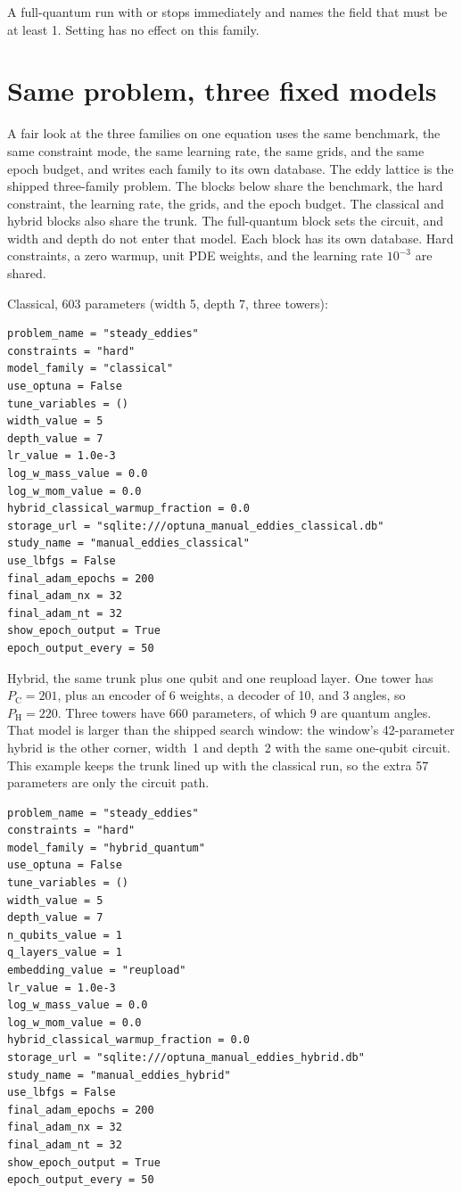 A full-quantum run with  or  stops immediately and names the field that must be at least 1.
Setting  has no effect on this family.

\section{Same problem, three fixed models}
\label{ex:three-fixed}

A fair look at the three families on one equation uses the same benchmark, the same constraint mode, the same learning rate, the same grids, and the same epoch budget, and writes each family to its own database.
The eddy lattice is the shipped three-family problem.
The blocks below share the benchmark, the hard constraint, the learning rate, the grids, and the epoch budget.
The classical and hybrid blocks also share the trunk.
The full-quantum block sets the circuit, and width and depth do not enter that model.
Each block has its own database.
Hard constraints, a zero warmup, unit PDE weights, and the learning rate \(10^{-3}\) are shared.

Classical, 603 parameters (width 5, depth 7, three towers):

\begin{lstlisting}
problem_name = "steady_eddies"
constraints = "hard"
model_family = "classical"
use_optuna = False
tune_variables = ()
width_value = 5
depth_value = 7
lr_value = 1.0e-3
log_w_mass_value = 0.0
log_w_mom_value = 0.0
hybrid_classical_warmup_fraction = 0.0
storage_url = "sqlite:///optuna_manual_eddies_classical.db"
study_name = "manual_eddies_classical"
use_lbfgs = False
final_adam_epochs = 200
final_adam_nx = 32
final_adam_nt = 32
show_epoch_output = True
epoch_output_every = 50
\end{lstlisting}

Hybrid, the same trunk plus one qubit and one reupload layer.
One tower has \(P_{\mathrm{C}}=201\), plus an encoder of 6 weights, a decoder of 10, and 3 angles, so \(P_{\mathrm{H}}=220\).
Three towers have 660 parameters, of which 9 are quantum angles.
That model is larger than the shipped search window: the window's 42-parameter hybrid is the other corner, width~1 and depth~2 with the same one-qubit circuit.
This example keeps the trunk lined up with the classical run, so the extra 57 parameters are only the circuit path.

\begin{lstlisting}
problem_name = "steady_eddies"
constraints = "hard"
model_family = "hybrid_quantum"
use_optuna = False
tune_variables = ()
width_value = 5
depth_value = 7
n_qubits_value = 1
q_layers_value = 1
embedding_value = "reupload"
lr_value = 1.0e-3
log_w_mass_value = 0.0
log_w_mom_value = 0.0
hybrid_classical_warmup_fraction = 0.0
storage_url = "sqlite:///optuna_manual_eddies_hybrid.db"
study_name = "manual_eddies_hybrid"
use_lbfgs = False
final_adam_epochs = 200
final_adam_nx = 32
final_adam_nt = 32
show_epoch_output = True
epoch_output_every = 50
\end{lstlisting}

